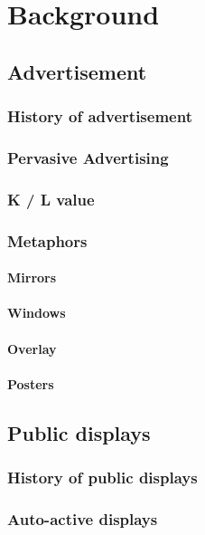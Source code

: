 
\chapter{Background} %

\label{Chapter2} %
\newpage

\section{Advertisement}
\subsection{History of advertisement}
\subsection{Pervasive Advertising}
\subsection{K / L value}
\subsection{Metaphors}
\subsubsection{Mirrors}
\subsubsection{Windows}
\subsubsection{Overlay}
\subsubsection{Posters}

\section{Public displays}
\subsection{History of public displays}
\subsection{Auto-active displays}

